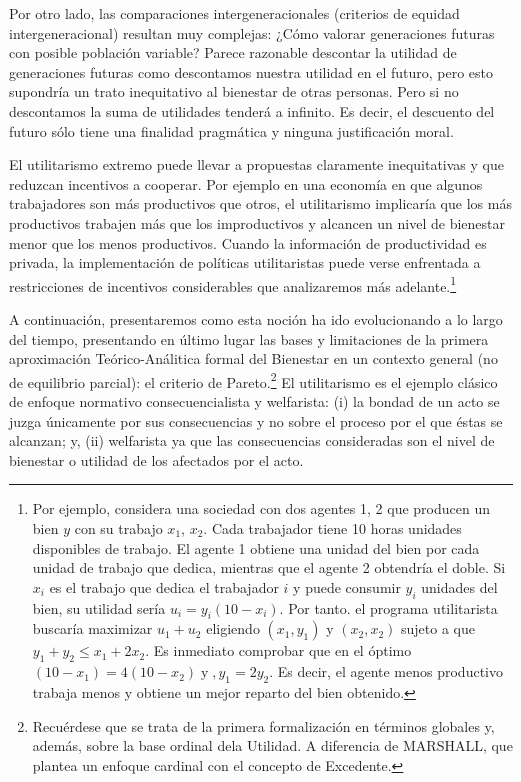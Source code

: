 \documentclass[10pt,a4paper]{article}
\begin{document}
Por otro lado, las comparaciones intergeneracionales (criterios de equidad intergeneracional) resultan muy complejas: ¿Cómo valorar generaciones futuras con posible población variable?  Parece razonable descontar la utilidad de generaciones futuras como descontamos nuestra utilidad en el futuro, pero esto supondría un trato inequitativo al bienestar de otras personas. Pero si no descontamos la suma de utilidades tenderá a infinito. Es decir, el descuento del futuro sólo tiene una finalidad pragmática y ninguna justificación moral.


El utilitarismo extremo puede llevar a propuestas claramente inequitativas y que reduzcan incentivos a cooperar. Por ejemplo en una economía en que algunos trabajadores son más productivos que otros, el utilitarismo implicaría que los más productivos trabajen más que los improductivos y alcancen un nivel de bienestar menor que los menos productivos. Cuando la información de productividad es privada, la implementación de políticas utilitaristas puede verse enfrentada a restricciones de incentivos considerables que analizaremos más adelante.\footnote{%
    Por ejemplo, considera una sociedad con dos agentes 1, 2 que producen un bien $y$ con su trabajo $x_1$, $x_2$. Cada trabajador tiene 10 horas unidades disponibles de trabajo. El agente 1 obtiene una unidad del bien por cada unidad de trabajo que dedica, mientras que el agente 2 obtendría el doble. Si $x_i$ es el trabajo que dedica el trabajador $i$ y puede consumir $y_i$ unidades del bien, su utilidad sería $u_i=y_i(10-x_i)$. Por tanto. el programa utilitarista buscaría maximizar $u_1 + u_2$ eligiendo
$(x_1 , y_1)$ y $(x_2,x_2)$ sujeto a que $y_1 + y_2 \leq x_1 + 2x_2$. Es inmediato comprobar que en el óptimo $(10 -x_1) = 4(10 - x_2)\; \text{y}\;, y_1= 2y_2$. Es decir, el agente menos productivo trabaja menos y obtiene un mejor reparto del bien obtenido.
}






A continuación, presentaremos como esta noción ha ido evolucionando a lo largo del tiempo, presentando en último lugar las bases y limitaciones de la primera aproximación Teórico-Análitica formal del Bienestar en un contexto general (no de equilibrio parcial): el criterio de Pareto.\footnote{%
    Recuérdese que se trata de la primera formalización en términos globales y, además, sobre la base ordinal dela Utilidad. A diferencia de MARSHALL, que plantea un enfoque cardinal con el concepto de Excedente.
} El utilitarismo es el ejemplo clásico de enfoque normativo consecuencialista y welfarista: (i) la bondad de un acto se juzga únicamente por sus consecuencias y no sobre el proceso por el que éstas se alcanzan; y, (ii) welfarista ya que las consecuencias consideradas son el nivel de bienestar o utilidad de los afectados por el acto.
\end{document}
